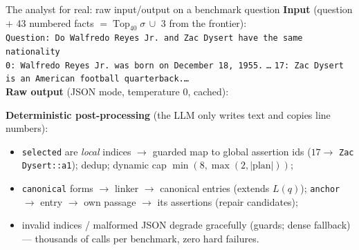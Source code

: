 \documentclass[aspectratio=169,10pt]{beamer}
\DeclareMathOperator*{\Top}{Top}
\begin{document}
\begin{frame}{The analyst for real: raw input/output on a benchmark question}
\scriptsize
\textbf{Input} (question $+$ 43 numbered facts $=\Top_{40}\sigma\,\cup$ 3 from the frontier):\\[0.5mm]
\texttt{Question: Do Walfredo Reyes Jr. and Zac Dysert have the same nationality}\\
\texttt{0: Walfredo Reyes Jr. was born on December 18, 1955.}\;
\texttt{\dots}\;
\texttt{17: Zac Dysert is an American football quarterback.}\;\texttt{\dots}\\[1mm]
\textbf{Raw output} (JSON mode, temperature 0, cached):
\begin{center}
\scriptsize
{}
\end{center}
\vspace{1mm}
\textbf{Deterministic post-processing} (the LLM only writes text and copies
line numbers):
\begin{itemize}\scriptsize
\item \texttt{selected} are \emph{local} indices $\to$ guarded map to global
  assertion ids ($17\to$ \texttt{Zac Dysert::a1}); dedup; dynamic cap
  $\min(8,\max(2,|\text{plan}|))$;
\item \texttt{canonical} forms $\to$ linker $\to$ canonical entries (extends
  $L(q)$); \texttt{anchor} $\to$ entry $\to$ own passage $\to$ its
  assertions (repair candidates);
\item invalid indices / malformed JSON degrade gracefully (guards; dense
  fallback) --- thousands of calls per benchmark, zero hard failures.
\end{itemize}
\end{frame}
\end{document}
